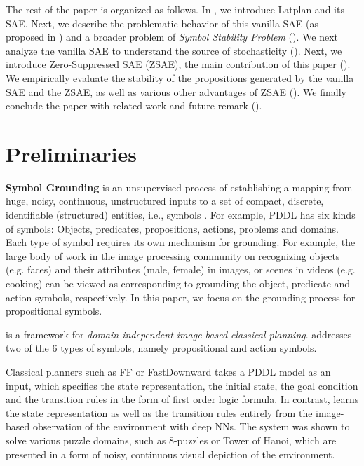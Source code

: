 The rest of the paper is organized as follows.
In , we introduce Latplan \cite{Asai2018} and its SAE.
Next, we describe the problematic behavior of this vanilla SAE (as proposed in \cite{Asai2018}) and
a broader problem of \emph{Symbol Stability Problem} ().
We next analyze the vanilla SAE to understand the source of stochasticity ().
Next, we introduce Zero-Suppressed SAE (ZSAE), the main contribution of this paper ().
We empirically evaluate the stability of the propositions generated by the vanilla SAE and the ZSAE,
as well as various other advantages of ZSAE ().
We finally conclude the paper with related work and future remark ().


\section{Preliminaries}
\label{background}

\textbf{Symbol Grounding} is an unsupervised process of establishing a mapping
from huge, noisy, continuous, unstructured inputs
to a set of compact, %
discrete, identifiable (structured) entities, i.e., symbols \cite{Asai2018}.
For example, PDDL has six kinds of symbols: Objects, predicates, propositions, actions, problems and domains.
Each type of symbol requires its own mechanism for grounding.
For example, the large body of work in the image processing community on recognizing 
objects (e.g. faces) and their attributes (male, female) in images, or scenes in videos (e.g. cooking)
can be viewed as corresponding to grounding the object, predicate and action symbols, respectively.
In this paper, we focus on the grounding process for propositional symbols.

\textbf{\latentplanner} \cite{Asai2018} is a framework for
\emph{domain-independent image-based classical planning}.
\latentplanner addresses two of the 6 types of symbols, %
namely propositional and action symbols.

Classical planners such as FF \cite{Hoffmann01} or
FastDownward \cite{Helmert04} takes a PDDL model as an input, which
specifies the state representation, the initial state, the goal
condition and the transition rules in the form of first order logic
formula.  In contrast, \latentplanner learns the state representation as well as the transition rules
entirely from the image-based observation of the environment with deep NNs.
The system was shown to solve various puzzle domains, such as 8-puzzles or Tower of Hanoi,
which are presented in a form of noisy, continuous visual depiction of the environment.

